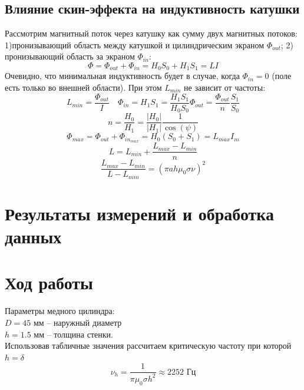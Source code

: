 \documentclass[a4paper,12pt]{article}
\begin{document}
\subsection{Влияние скин-эффекта на индуктивность катушки}
Рассмотрим магнитный поток через катушку как сумму двух магнитных потоков: 1)пронизывающий область между катушкой и цилиндрическим экраном $\Phi_{out}$; 2) пронизывающий область за экраном $\Phi_{in}$:
\begin{equation}
    \Phi = \Phi_{out} + \Phi_{in} = H_0 S_0 + H_1 S_1 = L I
\end{equation}
Очевидно, что минимальная индуктивность будет в случае, когда $\Phi_{in} = 0$ (поле есть только во внешней области). При этом $L_{min}$ не зависит от частоты:
\begin{equation}
    L_{min}  = \dfrac{\Phi_{out}}{I} \quad \Phi_{in} = H_1 S_1 = \dfrac{H_1 S_1}{H_0 S_0} \Phi_{out} = \dfrac{\Phi_{out}}{n} \dfrac{S_1}{S_0}
\end{equation}
\begin{equation}
    n = \dfrac{H_0}{H_1} = \dfrac{|H_0|}{|H_1|} \dfrac{1}{\cos (\psi)}
\end{equation}
\begin{equation}
    \Phi_{max} = \Phi_{out} + \Phi_{in_{max}} = H_0(S_0 + S_1 ) = L_{max} I_m
\end{equation}
\begin{equation}
    L = L_{min} + \dfrac{L_{max} - L_{min} }{n}
\end{equation}
\begin{equation}
    \dfrac{L_{max} - L_{min}}{L - L_{min}} = (\pi a h \mu_0 \sigma \nu)^2
\end{equation}

\section{Результаты измерений и обработка данных}


\section{Ход работы}

Параметры медного цилиндра:\\
$D = 45$ мм -- наружный диаметр\\
$h = 1.5$ мм -- толщина стенки.\\
Использовав табличные значения рассчитаем критическую частоту при которой $ h = \delta$
$$
\nu_h = \dfrac{1}{\pi \mu_0 \sigma h^2} \approx 2252 \text{ Гц}
$$
\end{document}
